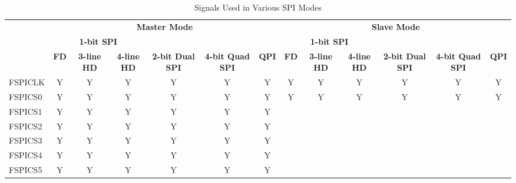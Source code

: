\documentclass[main\_\_EN.tex]{subfiles}
\begin{document}
\begin{landscape}
\begin{table}[H]
    \centering
    \caption{Signals Used in Various SPI Modes}
    \label{tab:spi-signals-various-spi-modes}

    \begin{threeparttable}
    \begin{tabular}{ |p{2.0cm} |c|c|c|c|c|c|c|c|c|c|c|c| }
    \hline
        \rowcolor{lightgray}
        & \multicolumn{6}{c|}{\textbf{Master Mode}} & \multicolumn{6}{c|}{\textbf{Slave Mode}} \\\cline{2-13}
        \rowcolor{lightgray}
        & \multicolumn{3}{c|}{\textbf{1-bit SPI}} & & & & \multicolumn{3}{c|}{\textbf{1-bit SPI}} & & & \\ \cline{2-4} \cline{8-10}
        \rowcolor{lightgray}
        \multirow{-3}{*}{\textbf{FSPI Signal}} & \textbf{FD\tnote{1}} & \textbf{3-line HD\tnote{2}} & \textbf{4-line HD} & \multirow{-2}{*}{\textbf{2-bit Dual SPI}} & \multirow{-2}{*}{\textbf{4-bit Quad SPI}} & \multirow{-2}{*}{\textbf{QPI}} & \textbf{FD} & \textbf{3-line HD} & \textbf{4-line HD} & \multirow{-2}{*}{\textbf{2-bit Dual SPI}} & \multirow{-2}{*}{\textbf{4-bit Quad SPI}} & \multirow{-2}{*}{\textbf{QPI}} \\ \hline
FSPICLK                  & Y       & Y       & Y       & Y       & Y       & Y      & Y       & Y      & Y       & Y       & Y       & Y      \\ \hline
FSPICS0                  & Y       & Y       & Y       & Y       & Y       & Y      & Y       & Y      & Y       & Y       & Y       & Y      \\ \hline
FSPICS1                  & Y       & Y       & Y       & Y       & Y       & Y      &         &        &         &         &         &        \\ \hline
FSPICS2                  & Y       & Y       & Y       & Y       & Y       & Y      &         &        &         &         &         &        \\ \hline
FSPICS3                  & Y       & Y       & Y       & Y       & Y       & Y      &         &        &         &         &         &        \\ \hline
FSPICS4                  & Y       & Y       & Y       & Y       & Y       & Y      &         &        &         &         &         &        \\ \hline
FSPICS5                  & Y       & Y       & Y       & Y       & Y       & Y      &         &        &         &         &         &        \\ \hline

\end{tabular}
\end{threeparttable}
\end{table}
\end{landscape}
\end{document}
